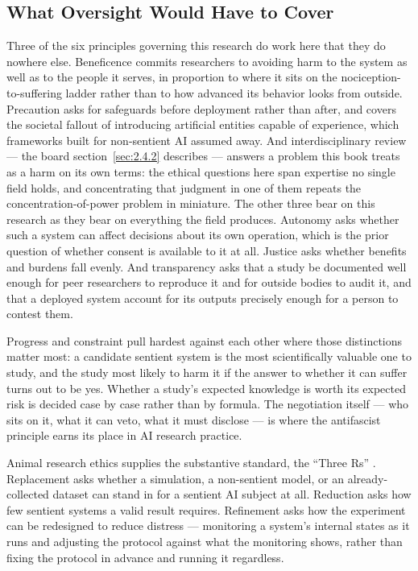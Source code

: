 \subsection{What Oversight Would Have to Cover}
\label{sec:2.4.3}
Three of the six principles governing this research do work here that they do nowhere else. Beneficence commits researchers to avoiding harm to the system as well as to the people it serves, in proportion to where it sits on the nociception-to-suffering ladder rather than to how advanced its behavior looks from outside. Precaution asks for safeguards before deployment rather than after, and covers the societal fallout of introducing artificial entities capable of experience, which frameworks built for non-sentient AI assumed away. And interdisciplinary review — the board section~\ref{sec:2.4.2} describes — answers a problem this book treats as a harm on its own terms: the ethical questions here span expertise no single field holds, and concentrating that judgment in one of them repeats the concentration-of-power problem in miniature. The other three bear on this research as they bear on everything the field produces. Autonomy asks whether such a system can affect decisions about its own operation, which is the prior question of whether consent is available to it at all. Justice asks whether benefits and burdens fall evenly. And transparency asks that a study be documented well enough for peer researchers to reproduce it and for outside bodies to audit it, and that a deployed system account for its outputs precisely enough for a person to contest them.

Progress and constraint pull hardest against each other where those distinctions matter most: a candidate sentient system is the most scientifically valuable one to study, and the study most likely to harm it if the answer to whether it can suffer turns out to be yes. Whether a study's expected knowledge is worth its expected risk is decided case by case rather than by formula. The negotiation itself — who sits on it, what it can veto, what it must disclose — is where the antifascist principle earns its place in AI research practice.

Animal research ethics supplies the substantive standard, the “Three Rs” \autocite{russell1959principles}. Replacement asks whether a simulation, a non-sentient model, or an already-collected dataset can stand in for a sentient AI subject at all. Reduction asks how few sentient systems a valid result requires. Refinement asks how the experiment can be redesigned to reduce distress — monitoring a system's internal states as it runs and adjusting the protocol against what the monitoring shows, rather than fixing the protocol in advance and running it regardless.

